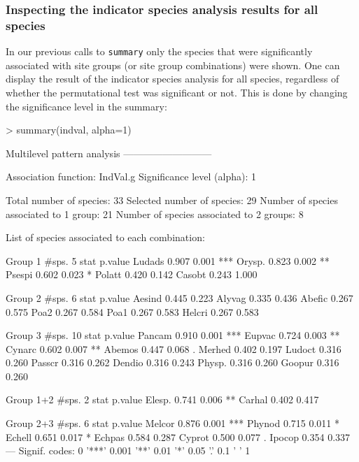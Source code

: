 \documentclass[11pt,a4paper]{article}
\begin{document}
\subsubsection{Inspecting the indicator species analysis results for all species}
In our previous calls to \texttt{summary} only the species that were significantly associated with site groups (or site group combinations) were shown. One can display the result of the indicator species analysis for all species, regardless of whether the permutational test was significant or not. This is done by changing the significance level in the summary:
\begin{Schunk}
\begin{Sinput}
> summary(indval, alpha=1)
\end{Sinput}
\begin{Soutput}
 Multilevel pattern analysis
 ---------------------------

 Association function: IndVal.g
 Significance level (alpha): 1

 Total number of species: 33
 Selected number of species: 29 
 Number of species associated to 1 group: 21 
 Number of species associated to 2 groups: 8 

 List of species associated to each combination: 

 Group 1  #sps.  5 
        stat p.value    
Ludads 0.907   0.001 ***
Orysp. 0.823   0.002 ** 
Psespi 0.602   0.023 *  
Polatt 0.420   0.142    
Casobt 0.243   1.000    

 Group 2  #sps.  6 
        stat p.value
Aesind 0.445   0.223
Alyvag 0.335   0.436
Abefic 0.267   0.575
Poa2   0.267   0.584
Poa1   0.267   0.583
Helcri 0.267   0.583

 Group 3  #sps.  10 
        stat p.value    
Pancam 0.910   0.001 ***
Eupvac 0.724   0.003 ** 
Cynarc 0.602   0.007 ** 
Abemos 0.447   0.068 .  
Merhed 0.402   0.197    
Ludoct 0.316   0.260    
Passcr 0.316   0.262    
Dendio 0.316   0.243    
Physp. 0.316   0.260    
Goopur 0.316   0.260    

 Group 1+2  #sps.  2 
        stat p.value   
Elesp. 0.741   0.006 **
Carhal 0.402   0.417   

 Group 2+3  #sps.  6 
        stat p.value    
Melcor 0.876   0.001 ***
Phynod 0.715   0.011 *  
Echell 0.651   0.017 *  
Echpas 0.584   0.287    
Cyprot 0.500   0.077 .  
Ipocop 0.354   0.337    
---
Signif. codes:  0 '***' 0.001 '**' 0.01 '*' 0.05 '.' 0.1 ' ' 1 
\end{Soutput}
\end{Schunk}
\end{document}
